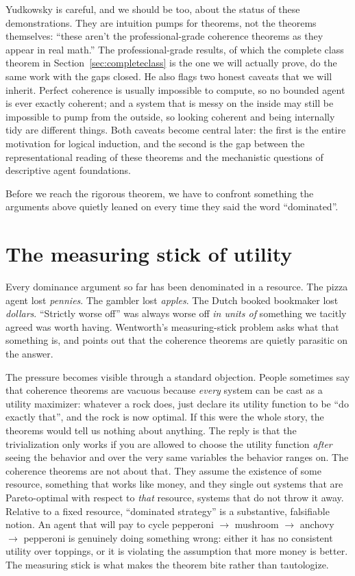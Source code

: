 \documentclass[10pt]{article}
\theoremstyle{definition}
\theoremstyle{remark}
\begin{document}
Yudkowsky is careful, and we should be too, about the status of these demonstrations. They are intuition pumps for theorems, not the theorems themselves: ``these aren't the professional-grade coherence theorems as they appear in real math.'' The professional-grade results, of which the complete class theorem in Section~\ref{sec:completeclass} is the one we will actually prove, do the same work with the gaps closed. He also flags two honest caveats that we will inherit. Perfect coherence is usually impossible to compute, so no bounded agent is ever exactly coherent; and a system that is messy on the inside may still be impossible to pump from the outside, so looking coherent and being internally tidy are different things. Both caveats become central later: the first is the entire motivation for logical induction, and the second is the gap between the representational reading of these theorems and the mechanistic questions of descriptive agent foundations.

Before we reach the rigorous theorem, we have to confront something the arguments above quietly leaned on every time they said the word ``dominated''.

\section{The measuring stick of utility}
\label{sec:measuringstick}

Every dominance argument so far has been denominated in a resource. The pizza agent lost \emph{pennies}. The gambler lost \emph{apples}. The Dutch booked bookmaker lost \emph{dollars}. ``Strictly worse off'' was always worse off \emph{in units of} something we tacitly agreed was worth having. Wentworth's measuring-stick problem asks what that something is, and points out that the coherence theorems are quietly parasitic on the answer.

The pressure becomes visible through a standard objection. People sometimes say that coherence theorems are vacuous because \emph{every} system can be cast as a utility maximizer: whatever a rock does, just declare its utility function to be ``do exactly that'', and the rock is now optimal. If this were the whole story, the theorems would tell us nothing about anything. The reply is that the trivialization only works if you are allowed to choose the utility function \emph{after} seeing the behavior and over the very same variables the behavior ranges on. The coherence theorems are not about that. They assume the existence of some resource, something that works like money, and they single out systems that are Pareto-optimal with respect to \emph{that} resource, systems that do not throw it away. Relative to a fixed resource, ``dominated strategy'' is a substantive, falsifiable notion. An agent that will pay to cycle pepperoni $\to$ mushroom $\to$ anchovy $\to$ pepperoni is genuinely doing something wrong: either it has no consistent utility over toppings, or it is violating the assumption that more money is better. The measuring stick is what makes the theorem bite rather than tautologize.
\end{document}
